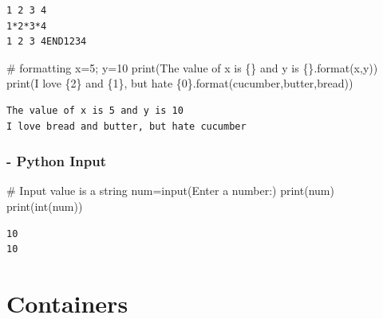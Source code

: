 \documentclass[
  letterpaper,
  DIV=11,
  numbers=noendperiod]{scrreprt}
\newenvironment{Shaded}{\begin{snugshade}}{\end{snugshade}}
\newcommand{\BuiltInTok}[1]{\textcolor[rgb]{0.00,0.23,0.31}{#1}}
\newcommand{\CommentTok}[1]{\textcolor[rgb]{0.37,0.37,0.37}{#1}}
\newcommand{\DecValTok}[1]{\textcolor[rgb]{0.68,0.00,0.00}{#1}}
\newcommand{\NormalTok}[1]{\textcolor[rgb]{0.00,0.23,0.31}{#1}}
\newcommand{\OperatorTok}[1]{\textcolor[rgb]{0.37,0.37,0.37}{#1}}
\newcommand{\SpecialCharTok}[1]{\textcolor[rgb]{0.37,0.37,0.37}{#1}}
\newcommand{\StringTok}[1]{\textcolor[rgb]{0.13,0.47,0.30}{#1}}
\begin{document}
\begin{verbatim}
1 2 3 4
1*2*3*4
1 2 3 4END1234
\end{verbatim}

\begin{Shaded}
\begin{Highlighting}[]
\CommentTok{\# formatting}
\NormalTok{x}\OperatorTok{=}\DecValTok{5}\OperatorTok{;}\NormalTok{ y}\OperatorTok{=}\DecValTok{10}
\BuiltInTok{print}\NormalTok{(}\StringTok{\textquotesingle{}The value of x is }\SpecialCharTok{\{\}}\StringTok{ and y is }\SpecialCharTok{\{\}}\StringTok{\textquotesingle{}}\NormalTok{.}\BuiltInTok{format}\NormalTok{(x,y))}
\BuiltInTok{print}\NormalTok{(}\StringTok{\textquotesingle{}I love }\SpecialCharTok{\{2\}}\StringTok{ and }\SpecialCharTok{\{1\}}\StringTok{, but hate }\SpecialCharTok{\{0\}}\StringTok{\textquotesingle{}}\NormalTok{.}\BuiltInTok{format}\NormalTok{(}\StringTok{\textquotesingle{}cucumber\textquotesingle{}}\NormalTok{,}\StringTok{\textquotesingle{}butter\textquotesingle{}}\NormalTok{,}\StringTok{\textquotesingle{}bread\textquotesingle{}}\NormalTok{))}
\end{Highlighting}
\end{Shaded}

\begin{verbatim}
The value of x is 5 and y is 10
I love bread and butter, but hate cucumber
\end{verbatim}

\subsection{- Python Input}\label{python-input}

\begin{Shaded}
\begin{Highlighting}[]
\CommentTok{\# Input value is a string}
\NormalTok{num}\OperatorTok{=}\BuiltInTok{input}\NormalTok{(}\StringTok{\textquotesingle{}Enter a number:\textquotesingle{}}\NormalTok{)}
\BuiltInTok{print}\NormalTok{(num)}
\BuiltInTok{print}\NormalTok{(}\BuiltInTok{int}\NormalTok{(num))}
\end{Highlighting}
\end{Shaded}

\begin{verbatim}
10
10
\end{verbatim}

\chapter{Containers}\label{containers}
\end{document}
